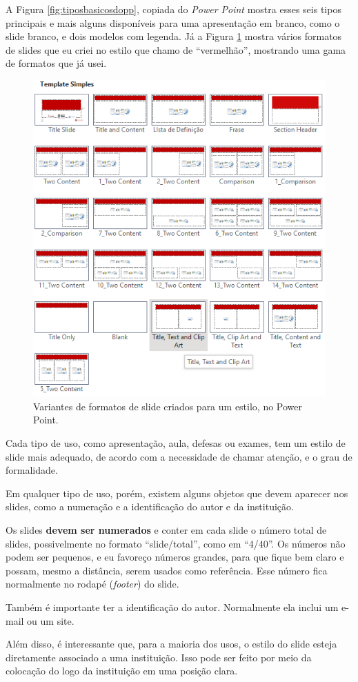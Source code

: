 A Figura \ref{fig:tiposbasicosdopp}, copiada do \textit{Power Point} mostra esses seis tipos principais e mais alguns disponíveis para uma apresentação em branco, como o slide branco, e dois modelos com legenda. Já a Figura \ref{fig:vermelhao} mostra vários formatos de slides que eu criei no estilo que chamo de ``vermelhão'', mostrando uma gama de formatos que já usei.

\begin{figure}[hbt]
    \centering
    \includegraphics[width=0.5\linewidth]{imagens/vermelhao}
    \caption{Variantes de formatos de slide criados para um estilo, no Power Point.}
    \label{fig:vermelhao}
\end{figure}


Cada tipo de uso, como apresentação, aula, defesas ou exames, tem um estilo de slide mais adequado, de acordo com a necessidade de chamar atenção, e o grau de formalidade.

Em qualquer tipo de uso, porém, existem alguns objetos que devem aparecer nos slides, como a numeração e a identificação do autor e da instituição.

Os slides \textbf{devem ser numerados} e conter em cada slide o número total de slides, possivelmente no formato ``slide/total'', como em ``4/40''. Os números não podem ser pequenos, e eu favoreço números grandes, para que fique bem claro e possam, mesmo a distância, serem usados como referência. Esse número fica normalmente no rodapé (\textit{footer}) do slide.

Também é importante ter a identificação do autor. Normalmente ela inclui um e-mail ou um site.

Além disso, é interessante que, para a maioria dos usos, o estilo do slide esteja diretamente associado a uma instituição. Isso pode ser feito por meio da colocação do logo da instituição em uma posição clara.


